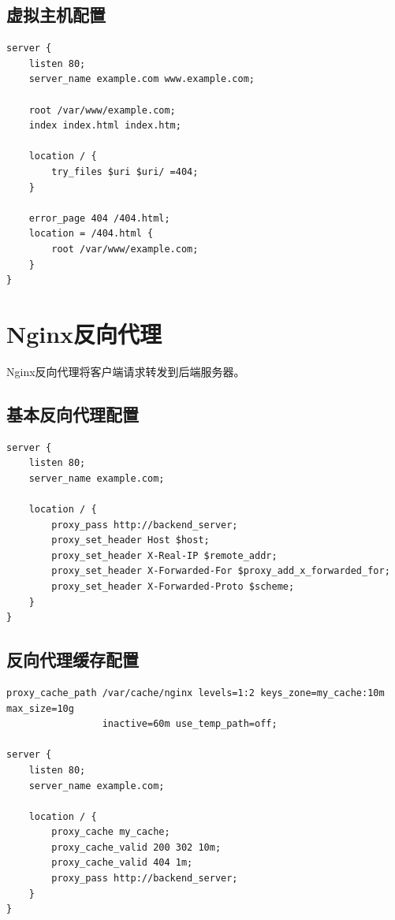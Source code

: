 \documentclass[12pt,UTF8]{ctexbook}
\begin{document}
\subsection*{虚拟主机配置}
\begin{lstlisting}
server {
    listen 80;
    server_name example.com www.example.com;
    
    root /var/www/example.com;
    index index.html index.htm;
    
    location / {
        try_files $uri $uri/ =404;
    }
    
    error_page 404 /404.html;
    location = /404.html {
        root /var/www/example.com;
    }
}
\end{lstlisting}

\section{Nginx反向代理}
\label{sec:nginx-proxy}

Nginx反向代理将客户端请求转发到后端服务器。

\subsection*{基本反向代理配置}
\begin{lstlisting}
server {
    listen 80;
    server_name example.com;
    
    location / {
        proxy_pass http://backend_server;
        proxy_set_header Host $host;
        proxy_set_header X-Real-IP $remote_addr;
        proxy_set_header X-Forwarded-For $proxy_add_x_forwarded_for;
        proxy_set_header X-Forwarded-Proto $scheme;
    }
}
\end{lstlisting}

\subsection*{反向代理缓存配置}
\begin{lstlisting}
proxy_cache_path /var/cache/nginx levels=1:2 keys_zone=my_cache:10m max_size=10g 
                 inactive=60m use_temp_path=off;

server {
    listen 80;
    server_name example.com;
    
    location / {
        proxy_cache my_cache;
        proxy_cache_valid 200 302 10m;
        proxy_cache_valid 404 1m;
        proxy_pass http://backend_server;
    }
}
\end{lstlisting}
\end{document}
